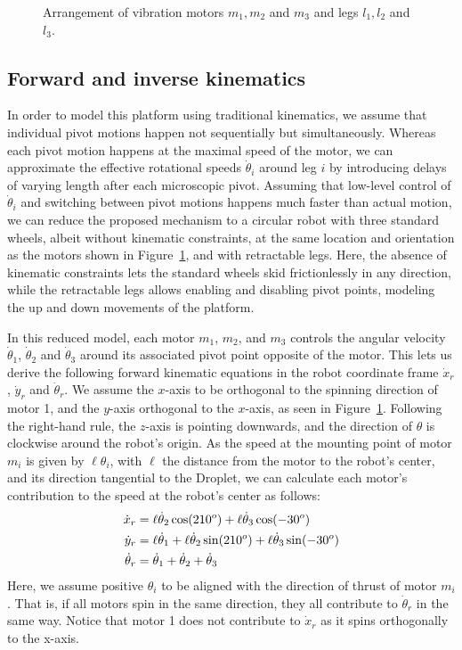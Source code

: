 \documentclass[letterpaper, 10pt, conference]{ieeeconf}
\begin{document}
\begin{figure}[h]
\centering

\caption{Arrangement of vibration motors $m_1, m_2$ and $m_3$ and legs $l_1, l_2$ and $l_3$.}
\label{DropletMotorDiagram}
\vspace{-0.5em}
\end{figure}

\subsection{Forward and inverse kinematics}
In order to model this platform using traditional kinematics, we assume that individual pivot motions happen not sequentially but simultaneously. Whereas each pivot motion happens at the maximal speed of the motor, we can approximate the effective rotational speeds $\dot{\theta}_i$ around leg $i$ by introducing delays of varying length after each microscopic pivot. Assuming that low-level control of $\dot{\theta}_i$ and switching between pivot motions happens much faster than actual motion, we can reduce the proposed mechanism to a circular robot with three standard wheels, albeit without kinematic constraints, at the same location and orientation as the motors shown in Figure~\ref{DropletMotorDiagram}, and with retractable legs. Here, the absence of kinematic constraints lets the standard wheels skid frictionlessly in any direction, while the retractable legs allows enabling and disabling pivot points, modeling the up and down movements of the platform. 

In this reduced model, each motor $m_1$, $m_2$, and $m_3$ controls the angular velocity $\dot{\theta}_1$, $\dot{\theta}_2$ and $\dot{\theta}_3$ around its associated pivot point opposite of the motor. This lets us derive the following forward kinematic equations in the robot coordinate frame $\dot{x}_r$, $\dot{y}_r$ and $\dot{\theta}_r$.
We assume the $x$-axis to be orthogonal to the spinning direction of motor 1, and the $y$-axis orthogonal to the $x$-axis, as seen in Figure~\ref{DropletMotorDiagram}. Following the right-hand rule, the $z$-axis is pointing downwards, and the direction of $\theta$ is clockwise around the robot's origin. As the speed at the mounting point of motor $m_i$ is given by $\ell \theta_i$, with $\ell$ the distance from the motor to the robot's center, and its direction tangential to the Droplet, we can calculate each motor's contribution to the speed at the robot's center as follows:
\begin{align}\label{eq:fwd}
\dot{x}_r &=  \ell \dot{\theta}_2 \cos(210^o) + \ell \dot{\theta}_3 \cos(-30^o)\notag\\
\dot{y}_r &=  \ell \dot{\theta}_1  +\ell \dot{\theta}_2 \sin(210^o) +\ell \dot{\theta}_3 \sin(-30^o)\\
\dot{\theta}_r &= \dot{\theta}_1 + \dot{\theta}_2 + \dot{\theta}_3\notag  
\end{align}
Here, we assume positive $\theta_i$ to be aligned with the direction of thrust of motor $m_i$. That is, if all motors spin in the same direction, they all contribute to $\dot{\theta}_r$ in the same way. Notice that motor 1 does not contribute to $\dot{x}_r$ as it spins orthogonally to the x-axis.
\end{document}

